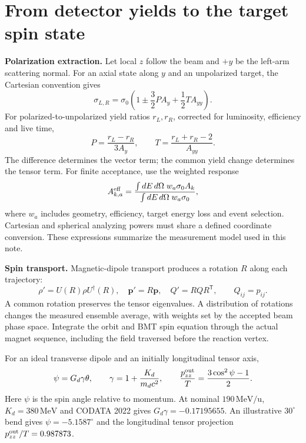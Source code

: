 \documentclass[11pt,a4paper]{article}
\newcommand{\unit}[1]{\,\mathrm{#1}}
\begin{document}
\section{From detector yields to the target spin state}
\textbf{Polarization extraction.} Let local $z$ follow the beam and $+y$ be the left-arm scattering normal. For an axial state along $y$ and an unpolarized target, the Cartesian convention gives
\begin{equation}
\sigma_{L,R}=\sigma_0\left(1\pm\frac32 PA_y+\frac12 TA_{yy}\right).
\end{equation}
For polarized-to-unpolarized yield ratios $r_L,r_R$, corrected for luminosity, efficiency and live time,
\begin{equation}
P=\frac{r_L-r_R}{3A_y},\qquad T=\frac{r_L+r_R-2}{A_{yy}}.
\end{equation}
The difference determines the vector term; the common yield change determines the tensor term. For finite acceptance, use the weighted response
\begin{equation}
A^{\rm eff}_{k,a}=\frac{\int dE\,d\Omega\;w_a\sigma_0 A_k}
{\int dE\,d\Omega\;w_a\sigma_0},
\end{equation}
where $w_a$ includes geometry, efficiency, target energy loss and event selection. Cartesian and spherical analyzing powers must share a defined coordinate conversion. These expressions summarize the measurement model used in this note.

\textbf{Spin transport.} Magnetic-dipole transport produces a rotation $R$ along each trajectory:
\begin{equation}
\rho'=U(R)\rho U^\dagger(R),\quad \bm p'=R\bm p,\quad Q'=RQR^{\mathsf T},\qquad Q_{ij}=p_{ij}.
\end{equation}
A common rotation preserves the tensor eigenvalues. A distribution of rotations changes the measured ensemble average, with weights set by the accepted beam phase space. Integrate the orbit and BMT spin equation through the actual magnet sequence, including the field traversed before the reaction vertex.\cite{BMT1959}

For an ideal transverse dipole and an initially longitudinal tensor axis,
\begin{equation}
\psi=G_d\gamma\theta,\qquad \gamma=1+\frac{K_d}{m_dc^2},\qquad
\frac{p_{zz}^{\rm out}}{T}=\frac{3\cos^2\psi-1}{2}.
\end{equation}
Here $\psi$ is the spin angle relative to momentum. At nominal $190\unit{MeV/u}$, $K_d=380\unit{MeV}$ and CODATA 2022 gives $G_d\gamma=-0.17195655$. An illustrative $30^\circ$ bend gives $\psi=-5.1587^\circ$ and the longitudinal tensor projection $p_{zz}^{\rm out}/T=0.987873$.\cite{CODATA2022}
\end{document}
